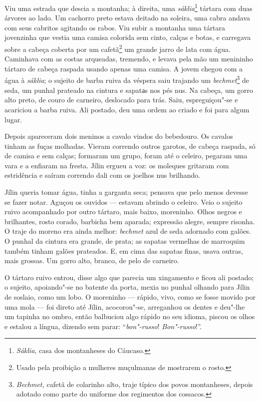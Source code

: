 Viu uma estrada que descia a montanha; à direita, uma
\emph{sáklia}\footnote{\emph{Sáklia,} casa dos montanheses do
  Cáucaso.} tártara com duas árvores ao lado. Um cachorro preto estava
deitado na soleira, uma cabra andava com seus cabritos agitando os
rabos. Viu subir a montanha uma tártara jovenzinha que vestia uma camisa
colorida sem cinto, calças e botas, e carregava sobre a cabeça coberta
por um cafetã\footnote{Usado pela proibição a mulheres muçulmanas de
  mostrarem o rosto.} um grande jarro de lata com água. Caminhava com as
costas arqueadas, tremendo, e levava pela mão um menininho tártaro de
cabeça raspada usando apenas uma camisa. A jovem chegou com a água à
\emph{sáklia}; o sujeito de barba ruiva da véspera saiu trajando um
\emph{bechmet}\footnote{\emph{Bechmet,} cafetã de colarinho alto,
  traje típico dos povos montanheses, depois adotado como parte do
  uniforme dos regimentos dos cossacos.} de seda, um punhal prateado na
cintura e sapatаs nos pés nus. Na cabeça, um gorro alto preto, de couro
de carneiro, deslocado para trás. Saiu, espreguiçou"-se e acariciou a
barba ruiva. Ali postado, deu uma ordem ao criado e foi para algum
lugar.

Depois apareceram dois meninos a cavalo vindos do bebedouro. Os cavalos
tinham as fuças molhadas. Vieram correndo outros garotos, de cabeça
raspada, só de camisa e sem calças; formaram um grupo, foram até o
celeiro, pegaram uma vara e a enfiaram na fresta. Jílin ergueu a voz: os
moleques gritaram com estridência e saíram correndo dali com os joelhos
nus brilhando.

Jílin queria tomar água, tinha a garganta seca; pensava que pelo menos
devesse se fazer notar. Aguçou os ouvidos --- estavam abrindo o celeiro.
Veio o sujeito ruivo acompanhado por outro tártaro, mais baixo,
moreninho. Olhos negros e brilhantes, rosto corado, barbicha bem
aparada; expressão alegre, sempre risonha. O traje do moreno era ainda
melhor: \emph{bechmet} azul de seda adornado com galões. O punhal da
cintura era grande, de prata; as sapatas vermelhas de marroquim também
tinham galões prateados. E, em cima das sapatas finas, usava outras,
mais grossas. Um gorro alto, branco, de pelo de carneiro.

O tártaro ruivo entrou, disse algo que parecia um xingamento e ficou ali
postado; o sujeito, apoiando"-se no batente da porta, mexia no punhal
olhando para Jílin de soslaio, como um lobo. O moreninho --- rápido,
vivo, como se fosse movido por uma mola --- foi direto até Jílin,
acocorou"-se, arreganhou os dentes e deu"-lhe um tapinha no ombro, então
balbuciou algo rápido no seu idioma, piscou os olhos e estalou a língua,
dizendo sem parar: ``\emph{bon"-russo}! \emph{Bon"-russo}!''.

